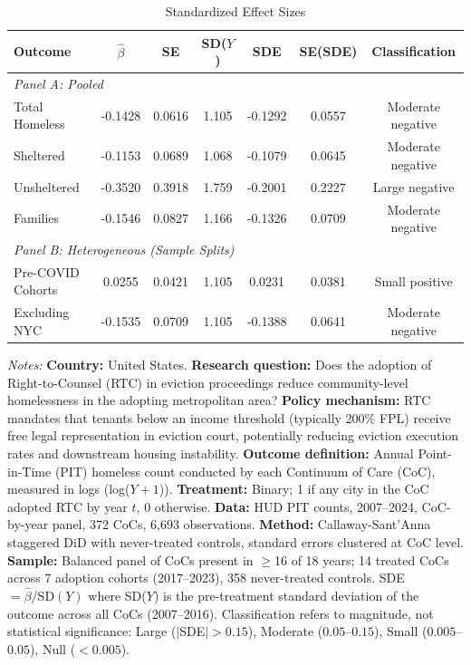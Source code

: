 \begin{table}[htbp]
\centering
\caption{Standardized Effect Sizes}
\label{tab:sde}
\begin{tabular}{lcccccc}
\hline\hline
Outcome & $\hat{\beta}$ & SE & SD($Y$) & SDE & SE(SDE) & Classification \\
\hline
\multicolumn{7}{l}{\textit{Panel A: Pooled}} \\[4pt]
Total Homeless & -0.1428 & 0.0616 & 1.105 & -0.1292 & 0.0557 & Moderate negative \\
Sheltered & -0.1153 & 0.0689 & 1.068 & -0.1079 & 0.0645 & Moderate negative \\
Unsheltered & -0.3520 & 0.3918 & 1.759 & -0.2001 & 0.2227 & Large negative \\
Families & -0.1546 & 0.0827 & 1.166 & -0.1326 & 0.0709 & Moderate negative \\
[6pt]
\multicolumn{7}{l}{\textit{Panel B: Heterogeneous (Sample Splits)}} \\[4pt]
Pre-COVID Cohorts & 0.0255 & 0.0421 & 1.105 & 0.0231 & 0.0381 & Small positive \\
Excluding NYC & -0.1535 & 0.0709 & 1.105 & -0.1388 & 0.0641 & Moderate negative \\
\hline\hline
\end{tabular}
\begin{tablenotes}
\item \textit{Notes:} \textbf{Country:} United States. \textbf{Research question:} Does the adoption of Right-to-Counsel (RTC) in eviction proceedings reduce community-level homelessness in the adopting metropolitan area? \textbf{Policy mechanism:} RTC mandates that tenants below an income threshold (typically 200\% FPL) receive free legal representation in eviction court, potentially reducing eviction execution rates and downstream housing instability. \textbf{Outcome definition:} Annual Point-in-Time (PIT) homeless count conducted by each Continuum of Care (CoC), measured in logs (log($Y + 1$)). \textbf{Treatment:} Binary; 1 if any city in the CoC adopted RTC by year $t$, 0 otherwise. \textbf{Data:} HUD PIT counts, 2007--2024, CoC-by-year panel, 372 CoCs, 6,693 observations. \textbf{Method:} Callaway-Sant'Anna staggered DiD with never-treated controls, standard errors clustered at CoC level. \textbf{Sample:} Balanced panel of CoCs present in $\geq$16 of 18 years; 14 treated CoCs across 7 adoption cohorts (2017--2023), 358 never-treated controls. SDE $= \hat{\beta} / \text{SD}(Y)$ where SD($Y$) is the pre-treatment standard deviation of the outcome across all CoCs (2007--2016). Classification refers to magnitude, not statistical significance: Large ($|$SDE$| > 0.15$), Moderate ($0.05$--$0.15$), Small ($0.005$--$0.05$), Null ($< 0.005$).
\end{tablenotes}
\end{table}
